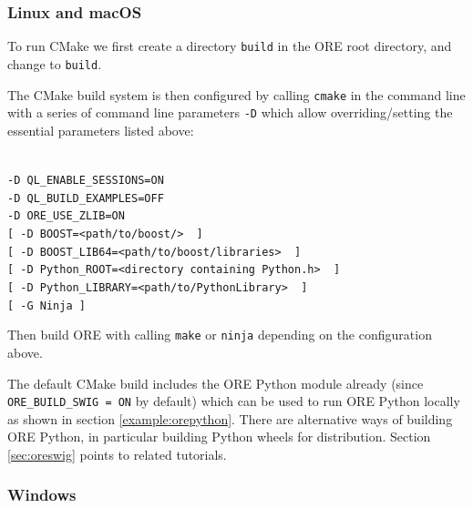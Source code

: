 \subsubsection*{Linux and macOS}

To run CMake we first create a directory {\tt build} in the ORE root directory, and change to {\tt build}.

The CMake build system is then configured by calling {\tt cmake} in the command line with a series of
command line parameters {\tt -D} which allow overriding/setting the essential parameters listed above:

\medskip
\hspace{1cm}{\tt cmake .. \bs} \\
\hspace{2cm} {\tt -D QL\_ENABLE\_SESSIONS=ON \bs } \\
\hspace{2cm} {\tt -D QL\_BUILD\_EXAMPLES=OFF \bs } \\
\hspace{2cm} {\tt -D ORE\_USE\_ZLIB=ON \bs}  \\
\hspace{2cm} {\tt [ -D BOOST=<path/to/boost/> \bs ~] } \\
\hspace{2cm} {\tt [ -D BOOST\_LIB64=<path/to/boost/libraries> \bs ~] } \\
\hspace{2cm} {\tt [ -D Python\_ROOT=<directory containing Python.h> \bs ~] } \\
\hspace{2cm} {\tt [ -D Python\_LIBRARY=<path/to/PythonLibrary> \bs ~] } \\
\hspace{2cm} {\tt [ -G Ninja ] }

\medskip
Then build ORE with calling {\tt make} or {\tt ninja} depending on the configuration above.

\medskip
The default CMake build includes the ORE Python module already (since {\tt ORE\_BUILD\_SWIG = ON} by default) which can
be used to run ORE Python locally as shown in section \ref{example:orepython}.
There are alternative ways of building ORE Python, in particular building Python wheels for distribution.
Section \ref{sec:oreswig} points to related tutorials.

\subsubsection*{Windows}

